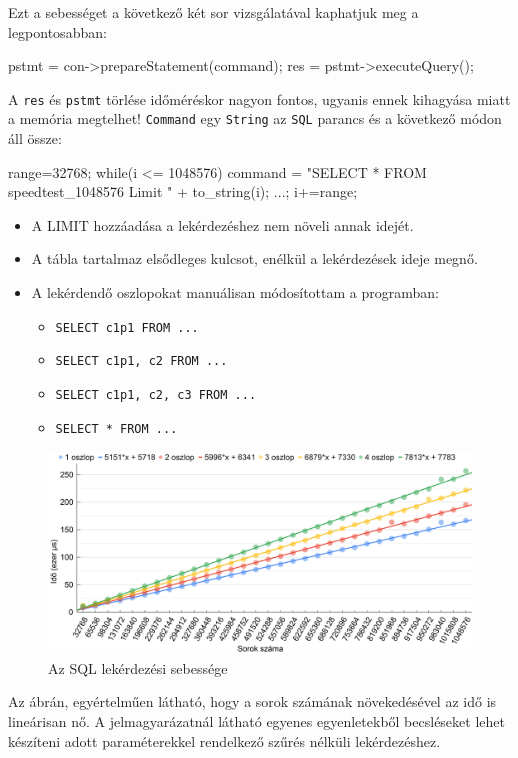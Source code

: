 Ezt a sebességet a következő két sor vizsgálatával kaphatjuk meg a legpontosabban:
\begin{python}
pstmt = con->prepareStatement(command);
res = pstmt->executeQuery();
\end{python}
A  \texttt{res} és \texttt{pstmt} törlése időméréskor nagyon fontos, ugyanis ennek kihagyása miatt a memória megtelhet!
\texttt{Command} egy \texttt{String} az \texttt{SQL} parancs és a következő módon áll össze:
\begin{python}
range=32768;
while(i <= 1048576){
   command = "SELECT * FROM speedtest_1048576 Limit "  + to_string(i);
   ...; i+=range; }
\end{python}
\begin{itemize}
\item A LIMIT hozzáadása a lekérdezéshez nem növeli annak idejét.
\item A tábla tartalmaz elsődleges kulcsot, enélkül a lekérdezések ideje megnő.
\item A lekérdendő oszlopokat manuálisan módosítottam a programban: 
\begin{itemize} 
\item \texttt{SELECT c1p1 FROM ...}
\item \texttt{SELECT c1p1, c2 FROM ...} 
\item \texttt{SELECT c1p1, c2, c3 FROM ...} 
\item \texttt{SELECT * FROM ...} 
\end{itemize}
\end{itemize}
\begin{figure}[h!]
\centering
\includegraphics[width=\textwidth]{images/graph/sqlquery.png}
\caption{Az SQL lekérdezési sebessége}
\label{fig:schema}
\end{figure}
Az ábrán, egyértelműen látható, hogy a sorok számának növekedésével az idő is lineárisan nő.
A jelmagyarázatnál látható egyenes egyenletekből becsléseket lehet készíteni adott paraméterekkel rendelkező szűrés nélküli lekérdezéshez. 

